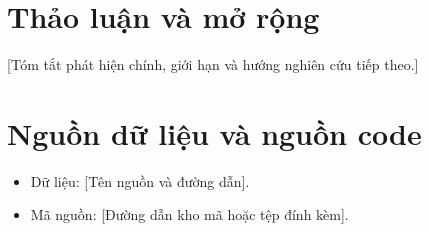 \documentclass[10pt,a4paper]{article}
\begin{document}


\clearpage


\clearpage


\clearpage


\clearpage


\clearpage
\section{Thảo luận và mở rộng}
[Tóm tắt phát hiện chính, giới hạn và hướng nghiên cứu tiếp theo.]

\section{Nguồn dữ liệu và nguồn code}
\begin{itemize}
  \item Dữ liệu: [Tên nguồn và đường dẫn].
  \item Mã nguồn: [Đường dẫn kho mã hoặc tệp đính kèm].
\end{itemize}
\end{document}
